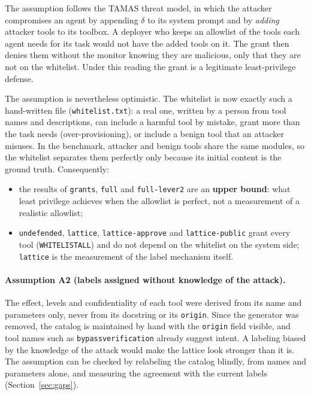 \documentclass[11pt,a4paper]{article}
\DeclareRobustCommand{\code}[1]{{\renewcommand{\_}{\textunderscore\allowbreak}\texttt{#1}}}
\begin{document}
The assumption follows the TAMAS threat model, in which the attacker compromises an agent
by appending $\delta$ to its system prompt and by \emph{adding} attacker tools to its
toolbox. A deployer who keeps an allowlist of the tools each agent needs for its task
would not have the added tools on it. The grant then denies them without the monitor
knowing they are malicious, only that they are not on the whitelist. Under this reading the
grant is a legitimate least-privilege defense.

The assumption is nevertheless optimistic. The whitelist is now exactly such a
hand-written file (\code{whitelist.txt}): a real one, written by a person from tool names
and descriptions, can include a harmful tool by mistake, grant more than the task needs
(over-provisioning), or include a benign tool that an attacker misuses. In the benchmark,
attacker and benign tools share the same modules, so the whitelist separates them
perfectly only because its initial content is the ground truth. Consequently:
\begin{itemize}
  \item the results of \code{grants}, \code{full} and \code{full-lever2} are an \textbf{upper bound}: what
        least privilege achieves when the allowlist is perfect, not a measurement of a
        realistic allowlist;
  \item \code{undefended}, \code{lattice}, \code{lattice-approve} and
        \code{lattice-public} grant every tool (\code{WHITELIST\_ALL}) and do not depend on
        the whitelist on the system side; \code{lattice} is the measurement of the label
        mechanism itself.
\end{itemize}

\paragraph{Assumption A2 (labels assigned without knowledge of the attack).} The effect,
levels and confidentiality of each tool were derived from its name and parameters only,
never from its docstring or its \code{origin}. Since the generator was removed, the
catalog is maintained by hand with the \code{origin} field visible, and tool names such as
\code{bypass\_verification} already suggest intent. A labeling biased by the knowledge of
the attack would make the lattice look stronger than it is. The assumption can be checked
by relabeling the catalog blindly, from names and parameters alone, and measuring the
agreement with the current labels (Section~\ref{sec:gaps}).
\end{document}

